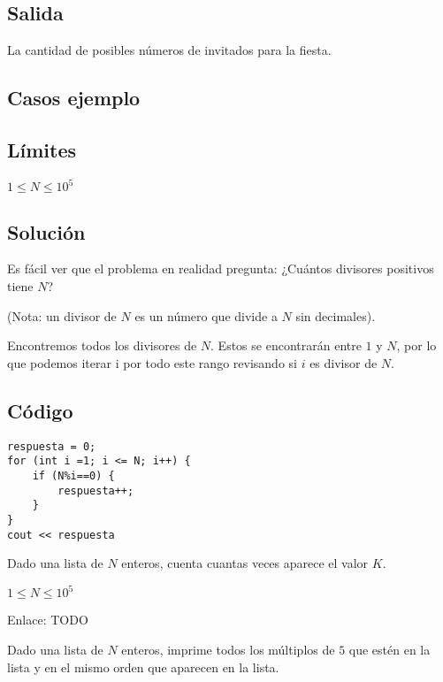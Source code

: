 \subsection*{Salida}
La cantidad de posibles números de invitados para la fiesta.
\subsection*{Casos ejemplo}
\begin{casebox2}
\end{casebox2}
\subsection*{Límites}
\begin{plimits}
	\item \(1\leq N \leq 10^5\)
\end{plimits}

\subsection*{Solución}
Es fácil ver que el problema en realidad pregunta: ¿Cuántos divisores positivos tiene \(N\)?

(Nota: un divisor de \(N\) es un número que divide a \(N\) sin decimales).

Encontremos todos los divisores de \(N\). Estos se encontrarán entre \(1\) y \(N\), por lo que podemos iterar i por todo este rango revisando si \(i\) es divisor de \(N\).
\subsection*{Código}
\begin{lstlisting}
respuesta = 0;
for (int i =1; i <= N; i++) {
	if (N%i==0) {
		respuesta++;
	}
}
cout << respuesta
\end{lstlisting}
\newpage
{}

\problemtitle Dado una lista de \(N\) enteros, cuenta cuantas veces aparece el valor \(K\). 

\begin{plimits}
	\item \( 1\leq N\leq 10^5 \)
\end{plimits}

Enlace: TODO

\problembreak

\problemtitle Dado una lista de \(N\) enteros, imprime todos los múltiplos de \(5\) que estén en la lista y en el mismo orden que aparecen en la lista. 

